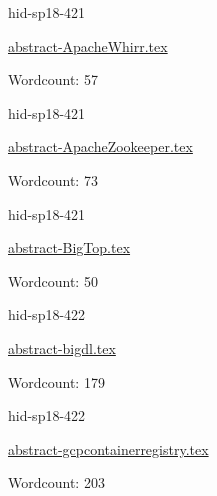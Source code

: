 

\begin{IU}

hid-sp18-421

\href{https://github.com/cloudmesh-community/hid-sp18-421/blob/master//technology/abstract-ApacheWhirr.tex}{abstract-ApacheWhirr.tex}

 

Wordcount: 57

\end{IU}



\begin{IU}

hid-sp18-421

\href{https://github.com/cloudmesh-community/hid-sp18-421/blob/master//technology/abstract-ApacheZookeeper.tex}{abstract-ApacheZookeeper.tex}

 

Wordcount: 73

\end{IU}



\begin{IU}

hid-sp18-421

\href{https://github.com/cloudmesh-community/hid-sp18-421/blob/master//technology/abstract-BigTop.tex}{abstract-BigTop.tex}

 

Wordcount: 50

\end{IU}



\begin{IU}

hid-sp18-422

\href{https://github.com/cloudmesh-community/hid-sp18-422/blob/master//technology/abstract-bigdl.tex}{abstract-bigdl.tex}

 

Wordcount: 179

\end{IU}



\begin{IU}

hid-sp18-422

\href{https://github.com/cloudmesh-community/hid-sp18-422/blob/master//technology/abstract-gcpcontainerregistry.tex}{abstract-gcpcontainerregistry.tex}

 

Wordcount: 203

\end{IU}

